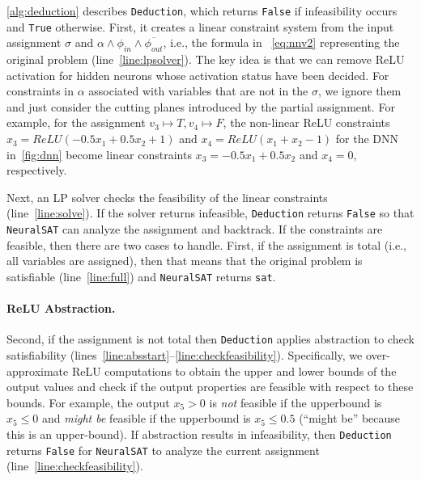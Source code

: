 \documentclass[oneside,11pt,dvipsnames]{book}
\numberwithin{equation}{section}
\theoremstyle{definition}
\theoremstyle{remark}
\newcommand{\hd}[1]{\iftoggle{usecomment}{{\color{blue}{[HD]: #1}}}{}}
\newcommand{\tool}{\texttt{NeuralSAT}}
\begin{document}


\autoref{alg:deduction} describes \texttt{Deduction}, which returns \texttt{False} if infeasibility occurs and  \texttt{True} otherwise.
First, it creates a linear constraint system from the input assignment $\sigma$ and $\alpha \land \phi_{in} \land \overline{\phi_{out}}$, i.e., the formula in ~\autoref{eq:nnv2} representing the original problem  (line~\ref{line:lpsolver}).
The key idea is that we can remove ReLU activation for hidden neurons whose activation status have been decided.
For constraints in $\alpha$ associated with variables that are not in the $\sigma$,  we ignore them and just consider the cutting planes introduced by the partial assignment.
For example, for the assignment $v_3\mapsto T, v_4 \mapsto F$, the non-linear ReLU constraints $x_3=ReLU(-0.5x_1+0.5x_2+1)$ and  $x_4=ReLU(x_1+x_2-1)$ for the DNN in~\autoref{fig:dnn} become linear constraints $x_3=-0.5x_1+0.5x_2$ and $x_4=0$, respectively.

Next, an LP solver checks the feasibility of the linear constraints (line~\ref{line:solve}).
If the solver returns infeasible,  \texttt{Deduction} returns \texttt{False} so that \tool{} can analyze the assignment and backtrack.
If the constraints are feasible, then there are two cases to handle. First, if the assignment is total (i.e., all variables are assigned), then that means that the original problem is satisfiable (line~\ref{line:full}) and \tool{} returns \texttt{sat}.

\paragraph{ReLU Abstraction.} Second, if the assignment is not total then \texttt{Deduction} applies abstraction to check satisfiability (lines~\ref{line:absstart}--\ref{line:checkfeasibility}).
Specifically, we over-approximate  ReLU computations to obtain the upper and lower bounds of the output values and check if the output properties are feasible with respect to these bounds. For example, the output $x_5 > 0$ is \emph{not} feasible if the upperbound is $x_5 \le 0$ and \emph{might be} feasible if the upperbound is $x_5 \le 0.5$ (``might be'' because this is an upper-bound). If abstraction results in infeasibility, then \texttt{Deduction} returns \texttt{False} for \tool{} to analyze the current assignment (line~\ref{line:checkfeasibility}).
\end{document}
